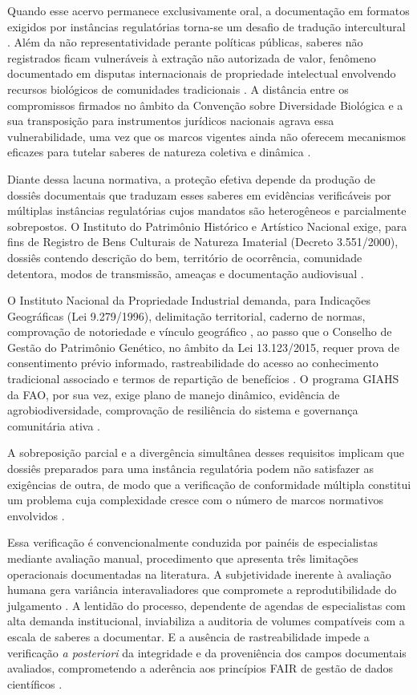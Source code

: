 Quando esse acervo permanece exclusivamente oral, a documentação em formatos exigidos por instâncias regulatórias torna-se um desafio de tradução intercultural \cite{Santilli2009}. Além da não representatividade perante políticas públicas, saberes não registrados ficam vulneráveis à extração não autorizada de valor, fenômeno documentado em disputas internacionais de propriedade intelectual envolvendo recursos biológicos de comunidades tradicionais \cite{Wynberg2015}. A distância entre os compromissos firmados no âmbito da Convenção sobre Diversidade Biológica e a sua transposição para instrumentos jurídicos nacionais agrava essa vulnerabilidade, uma vez que os marcos vigentes ainda não oferecem mecanismos eficazes para tutelar saberes de natureza coletiva e dinâmica \cite{Laird2020}.

Diante dessa lacuna normativa, a proteção efetiva depende da produção de dossiês documentais que traduzam esses saberes em evidências verificáveis por múltiplas instâncias regulatórias cujos mandatos são heterogêneos e parcialmente sobrepostos. O Instituto do Patrimônio Histórico e Artístico Nacional exige, para fins de Registro de Bens Culturais de Natureza Imaterial (Decreto 3.551/2000), dossiês contendo descrição do bem, território de ocorrência, comunidade detentora, modos de transmissão, ameaças e documentação audiovisual \cite{IPHAN2006}.

O Instituto Nacional da Propriedade Industrial demanda, para Indicações Geográficas (Lei 9.279/1996), delimitação territorial, caderno de normas, comprovação de notoriedade e vínculo geográfico \cite{Brasil1996}, ao passo que o Conselho de Gestão do Patrimônio Genético, no âmbito da Lei 13.123/2015, requer prova de consentimento prévio informado, rastreabilidade do acesso ao conhecimento tradicional associado e termos de repartição de benefícios \cite{Brasil2015}. O programa GIAHS da FAO, por sua vez, exige plano de manejo dinâmico, evidência de agrobiodiversidade, comprovação de resiliência do sistema e governança comunitária ativa \cite{FAO2018}.

A sobreposição parcial e a divergência simultânea desses requisitos implicam que dossiês preparados para uma instância regulatória podem não satisfazer as exigências de outra, de modo que a verificação de conformidade múltipla constitui um problema cuja complexidade cresce com o número de marcos normativos envolvidos \cite{BavikatteRobinson2011,Nemoga2022}.

Essa verificação é convencionalmente conduzida por painéis de especialistas mediante avaliação manual, procedimento que apresenta três limitações operacionais documentadas na literatura. A subjetividade inerente à avaliação humana gera variância interavaliadores que compromete a reprodutibilidade do julgamento \cite{Braun2006}. A lentidão do processo, dependente de agendas de especialistas com alta demanda institucional, inviabiliza a auditoria de volumes compatíveis com a escala de saberes a documentar. E a ausência de rastreabilidade impede a verificação \textit{a posteriori} da integridade e da proveniência dos campos documentais avaliados, comprometendo a aderência aos princípios FAIR de gestão de dados científicos \cite{Wilkinson2016}.

